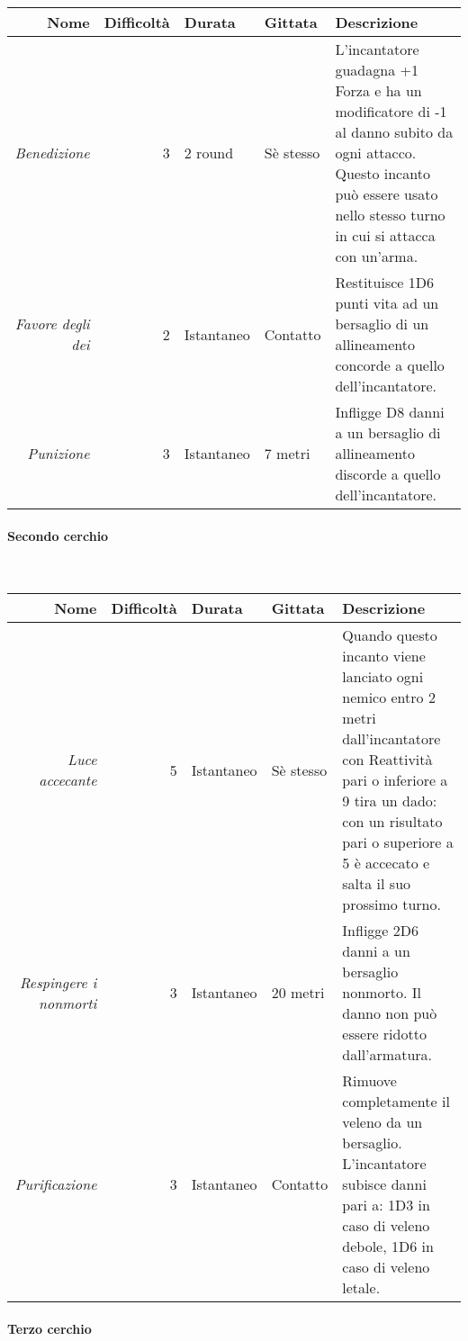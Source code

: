 \documentclass[../manuale_main.tex]{subfiles}
\begin{document}
\begin{tabularx}{\linewidth}{|N| D| T| G| Y|}
\hline
\textbf{Nome} & \textbf{Difficoltà} & \textbf{Durata} & \textbf{Gittata} & \textbf{Descrizione} \\ \hline\hline
\textit{Benedizione} & 3 & 2 round & Sè stesso &L'incantatore guadagna +1 Forza e ha un modificatore di -1 al danno subito da ogni attacco. Questo incanto può essere usato nello stesso turno in cui si attacca con un'arma. \\ \hline
\textit{Favore degli dei} & 2 &Istantaneo  & Contatto  & Restituisce 1D6 punti vita ad un bersaglio di un allineamento concorde a quello dell'incantatore.\\ \hline
\textit{Punizione} & 3 & Istantaneo & 7 metri &Infligge D8 danni a un bersaglio di allineamento discorde a quello dell'incantatore. \\ 
\hline
\end{tabularx}

\paragraph{Secondo cerchio}\mbox{}\\

\begin{tabularx}{\linewidth}{|N| D| T| G| Y|}
\hline
\textbf{Nome} & \textbf{Difficoltà} & \textbf{Durata} & \textbf{Gittata} & \textbf{Descrizione} \\ \hline\hline
\textit{Luce accecante} & 5 & Istantaneo & Sè stesso & Quando questo incanto viene lanciato ogni nemico entro 2 metri dall'incantatore con Reattività pari o inferiore a 9 tira un dado: con un risultato pari o superiore a 5 è accecato e salta il suo prossimo turno. \\ \hline
\textit{Respingere i nonmorti} & 3 &Istantaneo  & 20 metri  & Infligge 2D6 danni a un bersaglio nonmorto. Il danno non può essere ridotto dall'armatura.\\ \hline
\textit{Purificazione} & 3 & Istantaneo & Contatto &Rimuove completamente il veleno da un bersaglio. L'incantatore subisce danni pari a: 1D3 in caso di veleno debole, 1D6 in caso di veleno letale. \\ 
\hline
\end{tabularx}

\clearpage

\paragraph{Terzo cerchio}\mbox{}\\
\end{document}
